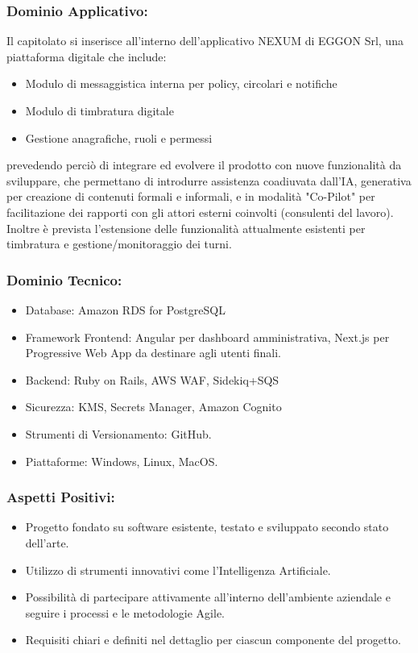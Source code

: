 \documentclass[a4paper,12pt]{article}
\begin{document}
\subsubsection*{Dominio Applicativo:}
Il capitolato si inserisce all'interno dell'applicativo NEXUM di EGGON Srl, una piattaforma digitale che include:
\begin{itemize}
    \item Modulo di messaggistica interna per policy, circolari e notifiche
    \item Modulo di timbratura digitale
    \item Gestione anagrafiche, ruoli e permessi
\end{itemize}
prevedendo perciò di integrare ed evolvere il prodotto con nuove funzionalità da sviluppare, che permettano di introdurre assistenza coadiuvata dall'IA, generativa per creazione di contenuti formali e informali, e in modalità "Co-Pilot" per facilitazione dei rapporti con gli attori esterni coinvolti (consulenti del lavoro). Inoltre è prevista l'estensione delle funzionalità attualmente esistenti per timbratura e gestione/monitoraggio dei turni.
 
\subsubsection*{Dominio Tecnico:}
\begin{itemize}
    \item Database: Amazon RDS for PostgreSQL
    \item Framework Frontend: Angular per dashboard amministrativa, Next.js per Progressive Web App da destinare agli utenti finali.
    \item Backend: Ruby on Rails, AWS WAF, Sidekiq+SQS
    \item Sicurezza: KMS, Secrets Manager, Amazon Cognito
    \item Strumenti di Versionamento: GitHub.
    \item Piattaforme: Windows, Linux, MacOS.
\end{itemize}
\subsubsection*{Aspetti Positivi:}
\begin{itemize}
    \item Progetto fondato su software esistente, testato e sviluppato secondo stato dell'arte.
    \item Utilizzo di strumenti innovativi come l'Intelligenza Artificiale.
    \item Possibilità di partecipare attivamente all'interno dell'ambiente aziendale e seguire i processi e le metodologie Agile.
    \item Requisiti chiari e definiti nel dettaglio per ciascun componente del progetto.
\end{itemize}
\end{document}
